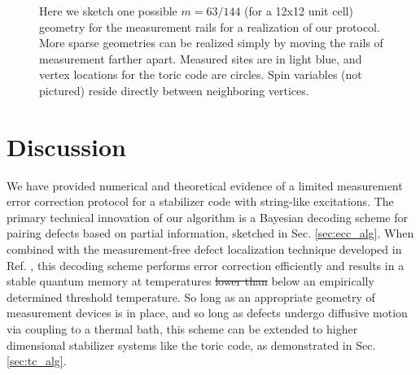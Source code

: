 \documentclass[twocolumn,superscriptaddress,aps,prb,floatfix]{revtex4-1}
\newcommand{\CMH}[1]{{\color{green} { #1}}}
\begin{document}
\begin{figure}
\begin{center}
\end{center}
\caption{Here we sketch one possible $m=63/144$ (for a 12x12 unit cell) geometry for the measurement rails for a realization of our protocol.  More sparse geometries can be realized simply by moving the rails of measurement farther apart.  Measured sites are in light blue, and vertex locations for the toric code are circles.  Spin variables (not pictured) reside directly between neighboring vertices.}
\label{fig:tc_fig}
\end{figure}




\section{Discussion}
\label{sec:discussion}

We have provided numerical and theoretical evidence of a limited measurement error correction protocol for a stabilizer code with string-like excitations.  The primary technical innovation of our algorithm is a Bayesian decoding scheme for pairing defects based on partial information, sketched in Sec. \ref{sec:ecc_alg}. When combined with the measurement-free defect localization technique developed in Ref. \cite{Freeman2016}, this decoding scheme performs error correction efficiently and results in a stable quantum memory at temperatures \CMH{\sout{lower than} below} an empirically determined threshold temperature.  So long as an appropriate geometry of measurement devices is in place, and so long as defects undergo diffusive motion via coupling to a thermal bath, this scheme can be extended to higher dimensional stabilizer systems like the toric code, as demonstrated in Sec. \ref{sec:tc_alg}.
\end{document}
